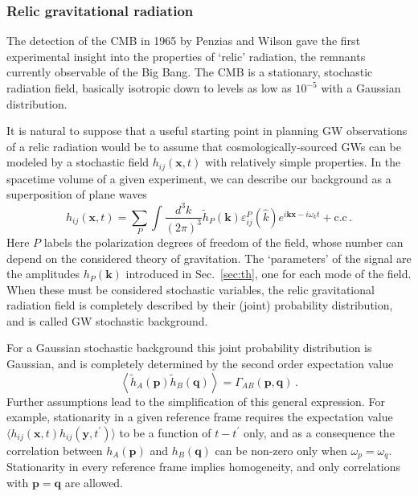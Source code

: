 \documentclass[11pt,a4paper]{article}
\begin{document}
\subsubsection{Relic gravitational radiation}

The detection of the CMB in 1965 by Penzias and Wilson gave the first experimental insight into the properties of `relic' radiation, the remnants currently observable of the Big Bang. The CMB is a stationary, stochastic radiation field, basically isotropic down to levels as low as $10^{-5}$ with a Gaussian distribution.

It is natural to suppose that a useful starting point in planning GW observations of a relic radiation would be to assume that cosmologically-sourced GWs can be modeled by a stochastic field $h_{ij}(\boldsymbol{x},t)$ with relatively simple properties.
In the spacetime volume of a given experiment, we can describe our background as a superposition of plane waves
\begin{equation}
h_{ij}(\boldsymbol{x},t) = \sum_P \int \frac{d^3 k}{(2\pi)^3} \tilde{h}_P(\boldsymbol{k}) \varepsilon_{ij}^P(\hat{k})
e^{i\boldsymbol{k}\boldsymbol{x}-i\omega_k t}
+\text{c.c} \,.
\end{equation}
%
Here $P$ labels the polarization degrees of freedom of the field, whose number can depend on the considered theory of gravitation. The `parameters' of the signal are the amplitudes $h_P(\boldsymbol{k})$ introduced in Sec.~\ref{sec:th}, one for each mode of the field. When these must be considered stochastic variables, the relic gravitational radiation field is completely described by their (joint) probability distribution, and is called GW stochastic background.

For a Gaussian stochastic background this joint probability distribution is Gaussian, and is completely determined by the second order expectation value
\begin{equation}
	\left< \tilde{h}_A(\boldsymbol{p}) \tilde{h}_B(\boldsymbol{q})  \right> = \Gamma_{AB}\left(\boldsymbol{p},\boldsymbol{q}\right) \,.
\end{equation}
%
Further assumptions lead to the simplification of this general expression. For example, stationarity in a given reference frame requires the expectation value $\langle h_{ij}(\boldsymbol{x},t)h_{ij}(\boldsymbol{y},t^\prime)\rangle$ to be a function of $t-t^\prime$ only, and as a consequence the correlation between $h_A(\boldsymbol{p})$ and $h_B(\boldsymbol{q})$ can be non-zero only when $\omega_p=\omega_q$. Stationarity in every reference frame implies homogeneity, and only correlations with $\boldsymbol{p}=\boldsymbol{q}$ are allowed.
\end{document}

